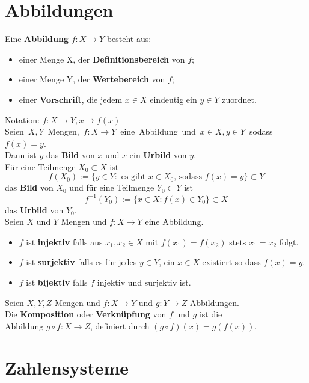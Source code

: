 \documentclass[12pt]{article}
\begin{document}
\section{Abbildungen}
Eine \textbf{Abbildung} $f: X \to Y$ besteht aus:
\begin{itemize}
    \item einer Menge X, der \textbf{Definitionsbereich} von $f$;
    \item einer Menge Y, der \textbf{Wertebereich} von $f$;
    \item einer \textbf{Vorschrift}, die jedem $x \in X$ eindeutig ein $y \in Y$ zuordnet.
\end{itemize}
Notation: $f: X \to Y, x \mapsto f(x)$ \\ 
\newline
\hbox{Seien $X, Y$ Mengen, $f: X \to Y$ eine Abbildung und $x \in X, y \in Y$ sodass $f(x)=y$.} \\
Dann ist $y$ das \textbf{Bild} von $x$ und $x$ ein \textbf{Urbild} von $y$.\\
Für eine Teilmenge $X_0 \subset X$ ist
\[f(X_0) := \{y \in Y: \text{ es gibt } x \in X_0 \text{, sodass } f(x)=y\} \subset Y\]
das \textbf{Bild} von $X_0$ und für eine Teilmenge $Y_0 \subset Y$ ist
\[f^{-1}(Y_0) := \{x \in X : f(x) \in Y_0\} \subset X\]
das \textbf{Urbild} von $Y_0$. \\ 
\newline
Seien $X$ und $Y$ Mengen und $f: X \to Y$ eine Abbildung.
\begin{itemize}
    \item[] $f$ ist \textbf{injektiv} falls aus $x_1,x_2 \in X$ mit $f(x_1) = f(x_2)$ stets $x_1 = x_2$ folgt.
    \item[] $f$ ist \textbf{surjektiv} falls es für jedes $y \in Y$, ein $x \in X$ existiert so dass $f(x) = y$.
    \item[] $f$ ist \textbf{bijektiv} falls $f$ injektiv und surjektiv ist.
\end{itemize}
Seien $X, Y, Z$ Mengen und $f: X \to Y$ und $g: Y \to Z$ Abbildungen.\\
Die \textbf{Komposition} oder \textbf{Verknüpfung} von $f$ und $g$ ist die\\
Abbildung $g \circ f: X \to Z$, definiert durch $(g \circ f)(x)=g(f(x))$.

\section{Zahlensysteme}
\end{document}

